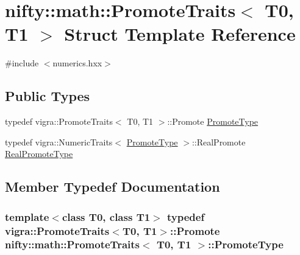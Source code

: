 \hypertarget{structnifty_1_1math_1_1PromoteTraits}{}\section{nifty\+:\+:math\+:\+:Promote\+Traits$<$ T0, T1 $>$ Struct Template Reference}
\label{structnifty_1_1math_1_1PromoteTraits}


{\ttfamily \#include $<$numerics.\+hxx$>$}

\subsection*{Public Types}
\begin{DoxyCompactItemize}
\item 
typedef vigra\+::\+Promote\+Traits$<$ T0, T1 $>$\+::Promote \hyperlink{structnifty_1_1math_1_1PromoteTraits_abcfa7e97456339d61654b607fd8b03f2}{Promote\+Type}
\item 
typedef vigra\+::\+Numeric\+Traits$<$ \hyperlink{structnifty_1_1math_1_1PromoteTraits_abcfa7e97456339d61654b607fd8b03f2}{Promote\+Type} $>$\+::Real\+Promote \hyperlink{structnifty_1_1math_1_1PromoteTraits_a21f91936d2b9aff18c220bc86529df98}{Real\+Promote\+Type}
\end{DoxyCompactItemize}


\subsection{Member Typedef Documentation}
\hypertarget{structnifty_1_1math_1_1PromoteTraits_abcfa7e97456339d61654b607fd8b03f2}{}
\subsubsection[{Promote\+Type}]{\setlength{\rightskip}{0pt plus 5cm}template$<$class T0, class T1$>$ typedef vigra\+::\+Promote\+Traits$<$T0, T1$>$\+::Promote {\bf nifty\+::math\+::\+Promote\+Traits}$<$ T0, T1 $>$\+::{\bf Promote\+Type}}\label{structnifty_1_1math_1_1PromoteTraits_abcfa7e97456339d61654b607fd8b03f2}
\hypertarget{structnifty_1_1math_1_1PromoteTraits_a21f91936d2b9aff18c220bc86529df98}{}
